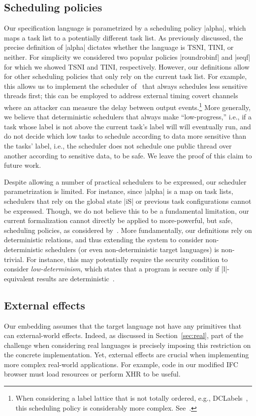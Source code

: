 \subsection{Scheduling policies}
Our specification language is parametrized by a scheduling policy
|alpha|, which maps a task list to a potentially different task list.
%
As previously discussed, the precise definition of |alpha|
dictates whether the language is TSNI, TINI, or neither.
%
For simplicity we considered two popular policies |roundrobinf| and
|seqf| for which we showed TSNI and TINI, respectively.
%
However, our definitions allow for other scheduling policies that only
rely on the current task list.
%
For example, this allows us to implement the scheduler of~\cite{Kashyap:2011}
that always schedules less sensitive threads first; this can be
employed to address external timing covert channels where an attacker
can measure the delay between output events.\footnote{
  When considering a label lattice that is not totally ordered, e.g.,
  DCLabels~\cite{myers:dlm,dclabels}, this scheduling policy is
  considerably more complex. See~\cite{Kashyap:2011}.
}
%
More generally, we believe that deterministic schedulers that always
make ``low-progress,'' i.e., if a task whose label is not above the
current task's label will will eventually run, and do not decide which
low tasks to schedule according to data more sensitive than the tasks'
label, i.e., the scheduler does not schedule one public thread over
another according to sensitive data, to be safe.
%
We leave the proof of this claim to future work.
%

Despite allowing a number of practical schedulers to be expressed, our
scheduler parametrization is limited.
%
For instance, since |alpha| is a map on task lists, schedulers that
rely on the global state |iS| or previous task configurations cannot
be expressed.
%
Though, we do not believe this to be a fundamental limitation, our
current formalization cannot directly be applied to more-powerful, but
safe, scheduling policies, as considered by~\cite{russo2006securing}.
%
More fundamentally, our definitions rely on deterministic relations,
and thus extending the system to consider non-deterministic schedulers
(or even non-deterministic target languages) is non-trivial.
%
For instance, this may potentially require the security condition to
consider \emph{low-determinism}, which states that a program is secure
only if |l|-equivalent results are deterministic~\cite{Zdancewic:Myers:CSFW03,
sabelfeld2003language}.

\subsection{External effects}
\label{sec:extensions:external}
Our embedding assumes that the target language not have any
primitives that can external-world effects.
%
Indeed, as discussed in Section~\ref{sec:real}, part of the challenge
when considering real languages is precisely imposing this restriction
on the concrete implementation.
%
Yet, external effects are crucial when implementing more complex
real-world applications.
%
For example, code in our modified IFC browser must load resources or
perform XHR to be useful.

